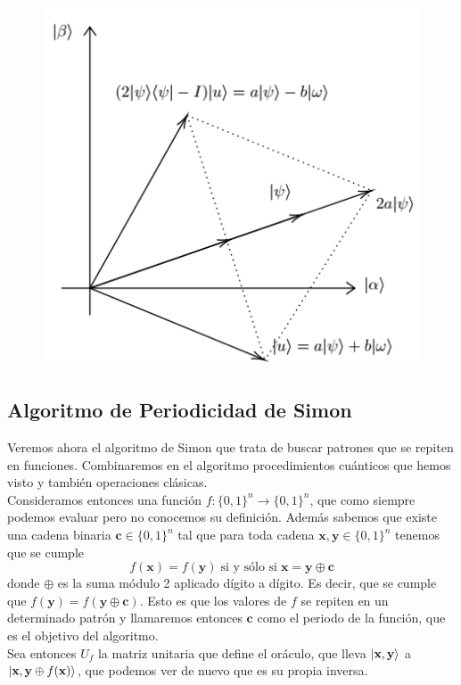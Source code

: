 \documentclass[a4paper]{article}
\numberwithin{equation}{section}
\begin{document}
\begin{figure}[b]
\centering
\includegraphics[scale=0.7]{simetria_grover}
\end{figure}


\newpage

\subsection{Algoritmo de Periodicidad de Simon}
Veremos ahora el algoritmo de Simon que trata de buscar patrones que se repiten en funciones. Combinaremos en el algoritmo procedimientos cuánticos que hemos visto y también operaciones clásicas.\\
\linebreak
Consideramos entonces una función $f:\{0,1\}^n \longrightarrow \{0,1\}^n$, que como siempre podemos evaluar pero no conocemos su definición. Además sabemos que existe una cadena binaria $\mathbf{c} \in \{0,1\}^n$ tal que para toda cadena $\mathbf{x},\mathbf{y}\in\{0,1\}^n$ tenemos que se cumple
\begin{equation}
f(\mathbf{x}) = f(\mathbf{y}) \; \text{si y sólo si} \; \mathbf{x} = \mathbf{y}\oplus \mathbf{c}
\end{equation}
donde $\oplus$ es la suma módulo 2 aplicado dígito a dígito. Es decir, que se cumple que $f(\mathbf{y}) = f(\mathbf{y}\oplus\mathbf{c})$. Esto es que los valores de $f$ se repiten en un determinado patrón y llamaremos entonces $\mathbf{c}$ como el periodo de la función, que es el objetivo del algoritmo.\\
\linebreak
Sea entonces $U_f$ la matriz unitaria que define el oráculo, que lleva $\ket{\mathbf{x}, \mathbf{y}}$ a $\ket{\mathbf{x}, \mathbf{y}\oplus f(\mathbf{x})}$, que podemos ver de nuevo que es su propia inversa. 
\end{document}
